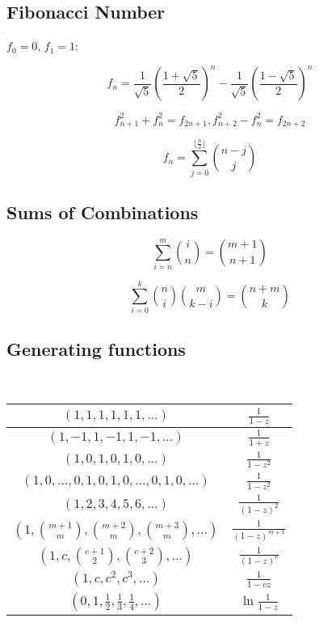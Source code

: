 \documentclass[a4paper]{amsart}
\begin{document}
    \subsection{Fibonacci Number} $f_0 = 0$, $f_1 = 1$:

    \begin{equation*}
     f_n = \frac{1}{\sqrt{5}}(\frac{1 + \sqrt{5}}{2})^n - \frac{1}{\sqrt{5}}(\frac{1 - \sqrt{5}}{2})^n
    \end{equation*}

    \begin{equation*}
     f_{n+1}^2 + f_n^2 = f_{2n + 1}, 
     f_{n+2}^2 - f_n^2 = f_{2n + 2}
    \end{equation*}

    \begin{equation*}
     f_n = \sum_{j = 0}^{\lfloor \frac{n}{2} \rfloor} \binom{n-j}{j}
    \end{equation*}

    \subsection{Sums of Combinations}

    \begin{equation*}
     \sum_{i = n}^m \binom{i}{n} = \binom{m + 1}{n + 1}
    \end{equation*}

    \begin{equation*}
     \sum_{i = 0}^k \binom{n}{i} \binom{m}{k - i} = \binom{n + m}{k}
    \end{equation*}


    \subsection{Generating functions}
      \ 

      \begin{tabular}{|c|c|}
        \hline
        $(1,1,1,1,1,1,\ldots)$ & $\frac{1}{1-z}$ \\ \hline
        $(1,-1,1,-1,1,-1,\ldots)$ & $\frac{1}{1+z}$ \\ \hline
        $(1,0,1,0,1,0,\ldots)$ & $\frac{1}{1-z^2}$ \\ \hline
        $(1,0,\ldots,0,1,0,1,0,\ldots,0,1,0,\ldots)$ & $\frac{1}{1-z^2}$ \\ \hline
        $(1,2,3,4,5,6,\ldots)$ & $\frac{1}{(1-z)^2}$ \\ \hline
        $(1,\binom{m+1}{m},\binom{m+2}{m},\binom{m+3}{m},\ldots)$ & $\frac{1}{(1-z)^{m+1}}$ \\ \hline
        $(1,c,\binom{c+1}{2},\binom{c+2}{3},\ldots)$ & $\frac{1}{(1-z)^c}$ \\ \hline
        $(1,c,c^2, c^3, \ldots)$ & $\frac{1}{1-cz}$ \\ \hline
        $(0,1,\frac{1}{2},\frac{1}{3},\frac{1}{4},\ldots)$ & $\ln \frac{1}{1-z}$ \\ \hline
      \end{tabular}
      
\end{document}
